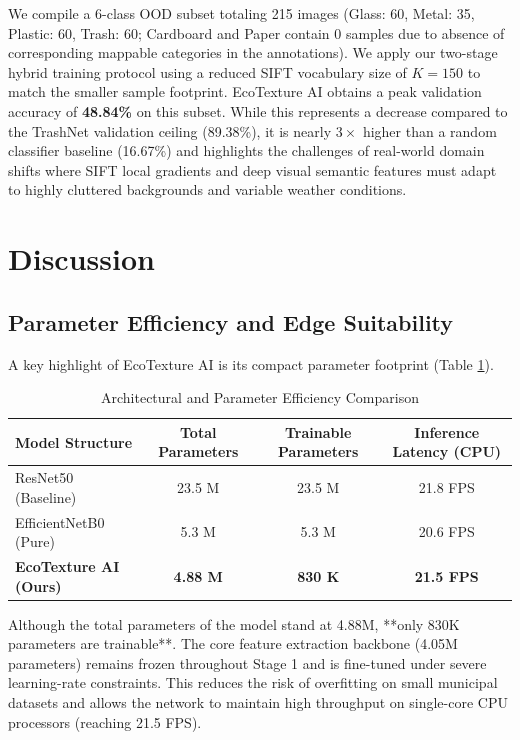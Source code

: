 \documentclass[12pt, a4paper]{article}
\begin{document}
We compile a 6-class OOD subset totaling 215 images (Glass: 60, Metal: 35, Plastic: 60, Trash: 60; Cardboard and Paper contain 0 samples due to absence of corresponding mappable categories in the annotations). We apply our two-stage hybrid training protocol using a reduced SIFT vocabulary size of $K=150$ to match the smaller sample footprint. EcoTexture AI obtains a peak validation accuracy of \textbf{48.84\%} on this subset. While this represents a decrease compared to the TrashNet validation ceiling (89.38\%), it is nearly $3\times$ higher than a random classifier baseline (16.67\%) and highlights the challenges of real-world domain shifts where SIFT local gradients and deep visual semantic features must adapt to highly cluttered backgrounds and variable weather conditions.

\section{Discussion}
\label{sec:discussion}

\subsection{Parameter Efficiency and Edge Suitability}
A key highlight of EcoTexture AI is its compact parameter footprint (Table \ref{tab:efficiency}). 

\begin{table}[H]
\centering
\caption{Architectural and Parameter Efficiency Comparison}
\label{tab:efficiency}
\begin{tabular}{lccc}
\toprule
\textbf{Model Structure} & \textbf{Total Parameters} & \textbf{Trainable Parameters} & \textbf{Inference Latency (CPU)} \\
\midrule
ResNet50 (Baseline) & 23.5 M & 23.5 M & 21.8 FPS \\
EfficientNetB0 (Pure) & 5.3 M & 5.3 M & 20.6 FPS \\
\textbf{EcoTexture AI (Ours)} & \textbf{4.88 M} & \textbf{830 K} & \textbf{21.5 FPS} \\
\bottomrule
\end{tabular}
\end{table}

Although the total parameters of the model stand at 4.88M, **only 830K parameters are trainable**. The core feature extraction backbone (4.05M parameters) remains frozen throughout Stage 1 and is fine-tuned under severe learning-rate constraints. This reduces the risk of overfitting on small municipal datasets and allows the network to maintain high throughput on single-core CPU processors (reaching 21.5 FPS).
\end{document}
